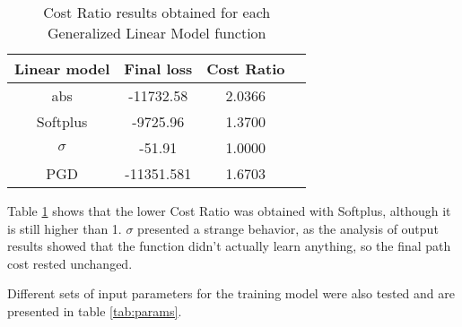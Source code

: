 \begin{table}[!ht]
\begin{center}
\caption{Cost Ratio results obtained for each Generalized Linear Model function}
\label{tab:GLM_performances}
\begin{tabular}{||c c c c||}  
  \hline 
  Linear model & Final loss & Cost Ratio \\ [0.5ex]  
  \hline\hline 
  abs & -11732.58 & 2.0366 \\  
  \hline
  Softplus & -9725.96 & 1.3700  \\  
  \hline 
  $\sigma$ & -51.91 & 1.0000  \\ 
  \hline 
  PGD & -11351.581 & 1.6703  \\ 
  \hline  
\end{tabular}
\end{center}
\end{table}

Table \ref{tab:GLM_performances} shows that the lower Cost Ratio was obtained with Softplus, although it is still higher than 1. $\sigma$ presented a strange behavior, as the analysis of output results showed that the function didn't actually learn anything, so the final path cost rested unchanged.

Different sets of input parameters for the training model were also tested and are presented in table \ref{tab:params}.

